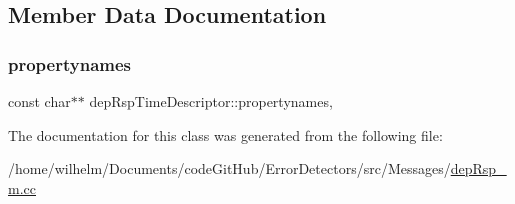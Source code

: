 \subsection{Member Data Documentation}
\mbox{\label{classdep_rsp_time_descriptor_aa00fe09f472957d38fb825d538d5c090}} 
\subsubsection{\texorpdfstring{propertynames}{propertynames}}
{\footnotesize\ttfamily const char$\ast$$\ast$ dep\+Rsp\+Time\+Descriptor\+::propertynames\hspace{0.3cm}{\ttfamily [mutable]}, {\ttfamily [private]}}



The documentation for this class was generated from the following file\+:\begin{DoxyCompactItemize}
\item 
/home/wilhelm/\+Documents/code\+Git\+Hub/\+Error\+Detectors/src/\+Messages/\hyperlink{dep_rsp__m_8cc}{dep\+Rsp\+\_\+m.\+cc}\end{DoxyCompactItemize}
